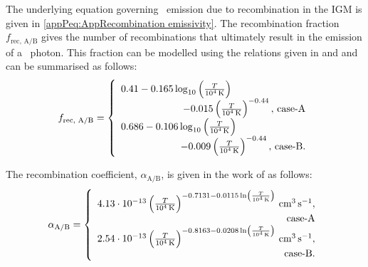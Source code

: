The underlying equation governing \lya\ emission due to recombination in the IGM is given in \cref{appPeq:AppRecombination emissivity}. The recombination fraction $f_\text{rec, A/B}$ gives the number of recombinations that ultimately result in the emission of a \lya\ photon. This fraction can be modelled using the relations given in \citet{2008ApJ...672...48C} and \citet{2014PASA...31...40D} and can be summarised as follows:
\begin{equation*}
    f_\text{rec, A/B} = \left\{
    \begin{array}{r}
        \multicolumn{1}{l}{0.41 - 0.165 \log_{10} \left( \frac{T}{10^4 \, \mathrm{K}} \right)} \\
        
        \qquad \qquad \qquad - 0.015 \left( \frac{T}{10^4 \, \mathrm{K}} \right)^{-0.44}, \, \text{case-A} \\
        
        \multicolumn{1}{l}{0.686 - 0.106 \log_{10} \left( \frac{T}{10^4 \, \mathrm{K}} \right)} \\
        
        \qquad \qquad \qquad - 0.009 \left( \frac{T}{10^4 \, \mathrm{K}} \right)^{-0.44}, \, \text{case-B.} \\
    \end{array}
    \right.
\end{equation*}

The recombination coefficient, $\alpha_\text{A/B}$, is given in the work of \citet{2011piim.book.....D} as follows:
\begin{equation*}
    \alpha_\text{A/B} = \left\{
    \begin{array}{r}
        \multicolumn{1}{l}{4.13 \cdot 10^{-13} \left( \frac{T}{10^4 \, \mathrm{K}} \right)^{-0.7131-0.0115 \ln \left( \frac{T}{10^4 \, \mathrm{K}} \right)} \, \mathrm{cm^{3} \, s^{-1}},} \\
        
        \text{case-A} \\
        
        \multicolumn{1}{l}{2.54 \cdot 10^{-13} \left( \frac{T}{10^4 \, \mathrm{K}} \right)^{-0.8163-0.0208 \ln \left( \frac{T}{10^4 \, \mathrm{K}} \right)} \, \mathrm{cm^{3} \, s^{-1}},} \\
        
        \text{case-B.} \\
    \end{array}
    \right.
\end{equation*}

